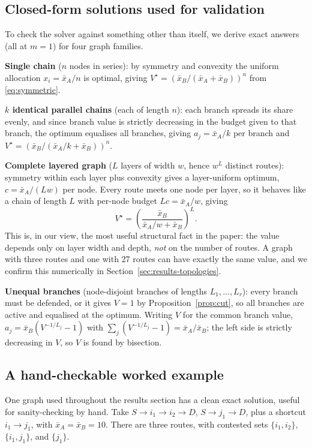 \documentclass[11pt,a4paper]{article}
\theoremstyle{plain}
\theoremstyle{definition}
\newcommand{\XA}{\bar{x}_A}
\newcommand{\XB}{\bar{x}_B}
\begin{document}
\subsection{Closed-form solutions used for validation}
\label{sec:methods-closed-form}

To check the solver against something other than itself, we derive exact
answers (all at $m=1$) for four graph families.

\textbf{Single chain} ($n$ nodes in series): by symmetry and convexity the
uniform allocation $x_i=\XA/n$ is optimal, giving
$V^{\star}=(\XB/(\XA+\XB))^n$ from \eqref{eq:symmetric}.

\textbf{$k$ identical parallel chains} (each of length $n$): each branch
spreads its share evenly, and since branch value is strictly decreasing
in the budget given to that branch, the optimum equalises all branches,
giving $a_j=\XA/k$ per branch and $V^{\star}=(\XB/(\XA/k+\XB))^n$.

\textbf{Complete layered graph} ($L$ layers of width $w$, hence $w^L$
distinct routes): symmetry within each layer plus convexity gives a
layer-uniform optimum, $c=\XA/(Lw)$ per node. Every route meets one node
per layer, so it behaves like a chain of length $L$ with per-node budget
$Lc=\XA/w$, giving
\begin{equation}
  V^{\star}=\left(\frac{\XB}{\XA/w+\XB}\right)^{\!L}.
  \label{eq:cf-layered}
\end{equation}
This is, in our view, the most useful structural fact in the paper: the
value depends only on layer width and depth, \emph{not} on the number of
routes. A graph with three routes and one with 27 routes can have exactly
the same value, and we confirm this numerically in
Section~\ref{sec:results-topologies}.

\textbf{Unequal branches} (node-disjoint branches of lengths
$L_1,\dots,L_r$): every branch must be defended, or it gives $V=1$ by
Proposition~\ref{prop:cut}, so all branches are active and equalised at
the optimum. Writing $V$ for the common branch value,
$a_j=\XB(V^{-1/L_j}-1)$ with $\sum_j(V^{-1/L_j}-1)=\XA/\XB$; the left side
is strictly decreasing in $V$, so $V$ is found by bisection.

\subsection{A hand-checkable worked example}
\label{sec:methods-worked}

One graph used throughout the results section has a clean exact solution,
useful for sanity-checking by hand. Take
$S\to i_1\to i_2\to D$, $S\to j_1\to D$, plus a shortcut $i_1\to j_1$,
with $\XA=\XB=10$. There are three routes, with contested sets
$\{i_1,i_2\}$, $\{i_1,j_1\}$, and $\{j_1\}$.
\end{document}
